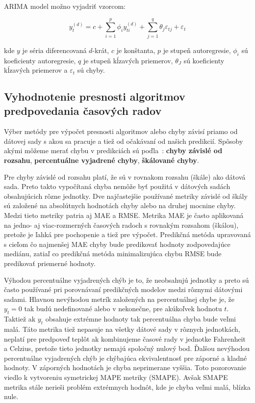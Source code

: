 \documentclass[thesismargins, thesislinespacing, openright, upjsfrontpage, combineabstracts]{rnthesis}
\begin{document}
ARIMA model možno vyjadriť vzorcom:
 
\begin{equation}
y_t^{(d)} = c + \sum_{i = 1} ^ {p} \phi_{i} y_{ti}^{(d)} + \sum_{j = 1}^{q} \theta_j \varepsilon_{tj} + \varepsilon_t
\end{equation}
 
kde $y$ je séria diferencovaná $d$-krát, $c$ je konštanta, $p$ je stupeň autoregresie, $\phi_i$ sú koeficienty autoregresie, $q$ je stupeň kĺzavých priemerov, $\theta_J$ sú koeficienty kĺzavých priemerov a $\varepsilon_t$ sú chyby.


\subsection{Vyhodnotenie presnosti algoritmov predpovedania časových radov}

Výber metódy pre výpočet presnosti algoritmov alebo chyby závisí priamo od dátovej sady s akou sa pracuje a tiež od očakávaní od našich predikcií. Spôsoby akými môžeme merať chybu v predikciách sú poďla~\cite{hyndman2018forecasting}:  \textbf{chyby závislé od rozsahu}, \textbf{percentuálne vyjadrené chyby},  \textbf{škálované chyby}. 

Pre chyby závislé od rozsahu platí, že sú v rovnakom rozsahu (škále) ako dátová sada. Preto takto vypočítaná chyba nemôže byť použitá v dátových sadách obsahujúcich rôzne jednotky. Dve najčastejšie používané metriky závislé od škály sú založené na absolútnych hodnotách chyby alebo na druhej mocnine chyby. Medzi tieto metriky patria aj MAE a RMSE. Metrika MAE je často aplikovaná na jedno- aj viac-rozmerných časových radoch s rovnakým rozsahom (škálou), pretože je ľahká pre pochopenie a tiež pre výpočet. Predikčná metóda upravovaná s cieľom čo najmenšej MAE chyby bude predikovať hodnoty zodpovedajúce mediánu, zatiaľ co predikčná metóda minimalizujúca chybu RMSE bude predikovať priemerné hodnoty. 

Výhodou percentuálne vyjadrených chýb je to, že neobsahujú jednotky a preto sú často používané pri porovnávaní predikčných modelov medzi rôznymi dátovými sadami. Hlavnou nevýhodou metrík založených na percentuálnej chybe je, že $y_{t} = 0$ tak budú nedefinované alebo v nekonečne, pre akúkoľvek hodnotu $t$. Taktiež ak $y_{t}$ obsahuje extrémne hodnoty tak percentuálna chyba bude veľmi malá. Táto metrika tiež nepasuje na všetky dátové sady v rôznych jednotkách, neplatí pre predpoveď teplôt ak kombinujeme časové rady v jednotke Fahrenheit a Celzius, pretože tieto jednotky nemajú spoločný nulový bod. Ďalšou nevýhodou percentuálne vyjadrených chýb je chýbajúca ekvivalentnosť pre záporné a kladné hodnoty. V záporných hodnotách je chyba neprimerane vyššia. Toto pozorovanie viedlo k vytvoreniu symetrickej MAPE metriky \cite{armstrong1985crystal} (SMAPE). Avšak SMAPE metrika stále nerieši problém extrémnych hodnôt, kde je chyba veľmi malá, blízka nule. 
\end{document}
